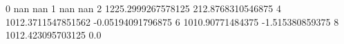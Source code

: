 0 nan nan
1 nan nan
2 1225.2999267578125 212.8768310546875
4 1012.3711547851562 -0.05194091796875
6 1010.90771484375 -1.515380859375
8 1012.423095703125 0.0
